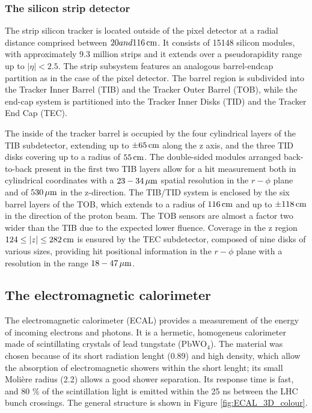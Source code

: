 \subsubsection{The silicon strip detector}
The strip silicon tracker is located outside of the pixel detector at a radial distance comprised between $20 and 116 \,\text{cm}$.
It consists of 15148 silicon modules, with approximately 9.3 million strips and it extends over a pseudorapidity range up to $|\eta| < 2.5$.
The strip subsystem features an analogous barrel-endcap partition as in the case of the pixel detector.
The barrel region is subdivided into the Tracker Inner Barrel (TIB) and the Tracker Outer Barrel (TOB),
while the end-cap system is partitioned into the Tracker Inner Disks (TID) and the Tracker End Cap (TEC).

The inside of the tracker barrel is occupied by the four cylindrical layers of the TIB subdetector,
extending up to $\pm 65 \,\text{cm}$ along the z axis, and the three TID disks covering up to a radius of $55 \,\text{cm}$.
The double-sided modules arranged back-to-back present in the first two TIB layers allow for a hit measurement both in cylindrical coordinates
with a $23-34 \,\mu\text{m}$ spatial resolution in the $r - \phi$ plane and of $530 \,\mu\text{m}$ in the z-direction.
The TIB/TID system is enclosed by the six barrel layers of the TOB, which extends to a radius of $116 \,\text{cm}$ and up to $\pm 118 \,\text{cm}$ in the direction of the proton beam.
The TOB sensors are almost a factor two wider than the TIB due to the expected lower fluence.
Coverage in the z region $124 \le |z| \le 282 \,\text{cm}$ is ensured by the TEC subdetector, composed of nine disks of various sizes,
providing hit positional information in the $r - \phi$ plane with a resolution in the range $18 - 47 \,\mu\text{m}$.

\subsection{The electromagnetic calorimeter}
The electromagnetic calorimeter (ECAL) \cite{CERN-LHCC-97-033} provides a measurement of the energy of incoming electrons and photons.
It is a hermetic, homogeneus calorimeter made of scintillating crystals of lead tungstate ($\mathrm{PbWO_4}$).
The material was chosen because of its short radiation lenght (0.89\cm) and high density,
which allow the absorption of electromagnetic showers within the short lenght;
its small Moli\`ere radius (2.2\cm) allows a good shower separation.
Its response time is fast, and 80 \% of the scintillation light is emitted within the 25 ns between the LHC bunch crossings.
The general structure is shown in Figure \ref{fig:ECAL_3D_colour}.

